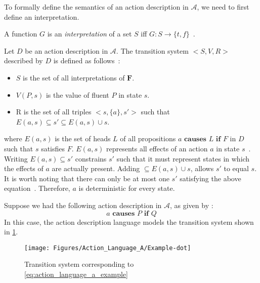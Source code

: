 To formally define the semantics of an action description in $\mathcal{A}$, we need to first define an interpretation.

\begin{definition}
    \label{def:interpretation}
    A function $G$ is an \textit{interpretation} of a set $S$ iff $G: S \rightarrow \{t, f\}$~\citep{gelfond_action_1998}.
\end{definition}

\begin{definition}
    Let $ D $ be an action description in $ \mathcal{A} $.
    The transition system $ <S, V, R> $ described by $ D $ is defined as follows~\citep{gelfond_action_1998}:

    \begin{itemize}
        \item $ S $ is the set of all interpretations of $ \boldsymbol{F} $.
        \item $ V(P, s) $ is the value of fluent $P$ in state $s$.
        \item R is the set of all triples $ <s, \{a\}, s'> $ such that $ E(a,s) \subseteq s' \subseteq E(a,s) \cup s $.
    \end{itemize}
    where $ E(a, s) $ is the set of heads $ L $ of all propositions $ a \textbf{ causes } L \textbf{ if } F $ in $ D $ such that $ s $ satisfies $ F $.
    $ E(a, s) $ represents all effects of an action $ a $ in state $ s $~\citep{gelfond_action_1998}.
    Writing $ E\left(a,s\right)\subseteq s' $ constrains $ s' $ such that it must represent states in which the effects of $ a $ are actually present.
    Adding $ \subseteq E\left(a,s\right)\cup s $, allows $ s' $ to equal $ s $.
    It is worth noting that there can only be at most one $ s' $ satisfying the above equation~\citep{gelfond_action_1998}.
    Therefore, $ a $ is deterministic for every state.
\end{definition}

Suppose we had the following action description in $\mathcal{A}$, as given by \citet{gelfond_action_1998}:
\begin{equation}
    \label{eq:action_language_a_example}
    a \textbf{ causes } P \textbf{ if } Q
\end{equation}
In this case, the action description language models the transition system shown in \cref{fig:action_language_a_example}.

\begin{figure}[h]
    \centering
    \texttt{[image: Figures/Action\_Language\_A/Example-dot]}
    \caption{Transition system corresponding to \cref{eq:action_language_a_example}}
    \label{fig:action_language_a_example}
\end{figure}

